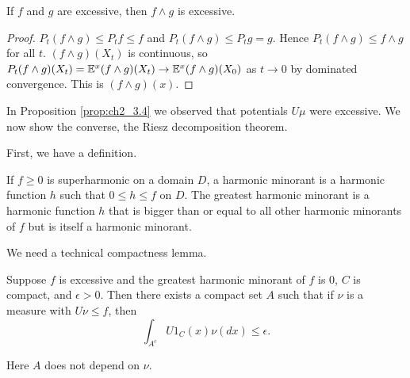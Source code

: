 \begin{corollary}\label{cor:ch2_6.11}
If $f$ and $g$ are excessive, then $f \wedge g$ is excessive.
\end{corollary}

\begin{proof}
$P_t(f \wedge g) \leq P_tf \leq f$ and $P_t(f \wedge g) \leq P_tg = g$. Hence $P_t(f \wedge g) \leq f \wedge g$ for all $t$. $(f \wedge g)(X_t)$ is continuous, so $P_t(f \wedge g)(X_t) = \mathbb{E}^x(f \wedge g)(X_t) \to \mathbb{E}^x(f \wedge g)(X_0)$ as $t \to 0$ by dominated convergence. This is $(f \wedge g)(x)$.
\end{proof}


In Proposition \ref{prop:ch2_3.4} we observed that potentials $U\mu$ were excessive. We now show the converse, the Riesz decomposition theorem.

First, we have a definition.


\begin{definition}\label{def:ch2_6.12}
If $f \geq 0$ is superharmonic on a domain $D$, a harmonic minorant is a harmonic function $h$ such that $0 \leq h \leq f$ on $D$. The greatest harmonic minorant is a harmonic function $h$ that is bigger than or equal to all other harmonic minorants of $f$ but is itself a harmonic minorant.
\end{definition}

We need a technical compactness lemma.

\begin{lemma}\label{lem:ch2_6.13}
Suppose $f$ is excessive and the greatest harmonic minorant of $f$ is $0$, $C$ is compact, and $\epsilon > 0$. Then there exists a compact set $A$ such that if $\nu$ is a measure with $U\nu \leq f$, then
\[
    \int_{A^c} U1_C(x)\nu(dx) \leq \epsilon.
\]
\end{lemma}

\mpagebreak

Here $A$ does not depend on $\nu$.

